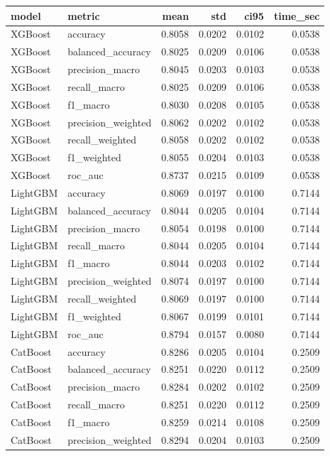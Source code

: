 \begin{tabular}{llrrrr}
\toprule
model & metric & mean & std & ci95 & time_sec \\
\midrule
XGBoost & accuracy & 0.8058 & 0.0202 & 0.0102 & 0.0538 \\
XGBoost & balanced_accuracy & 0.8025 & 0.0209 & 0.0106 & 0.0538 \\
XGBoost & precision_macro & 0.8045 & 0.0203 & 0.0103 & 0.0538 \\
XGBoost & recall_macro & 0.8025 & 0.0209 & 0.0106 & 0.0538 \\
XGBoost & f1_macro & 0.8030 & 0.0208 & 0.0105 & 0.0538 \\
XGBoost & precision_weighted & 0.8062 & 0.0202 & 0.0102 & 0.0538 \\
XGBoost & recall_weighted & 0.8058 & 0.0202 & 0.0102 & 0.0538 \\
XGBoost & f1_weighted & 0.8055 & 0.0204 & 0.0103 & 0.0538 \\
XGBoost & roc_auc & 0.8737 & 0.0215 & 0.0109 & 0.0538 \\
LightGBM & accuracy & 0.8069 & 0.0197 & 0.0100 & 0.7144 \\
LightGBM & balanced_accuracy & 0.8044 & 0.0205 & 0.0104 & 0.7144 \\
LightGBM & precision_macro & 0.8054 & 0.0198 & 0.0100 & 0.7144 \\
LightGBM & recall_macro & 0.8044 & 0.0205 & 0.0104 & 0.7144 \\
LightGBM & f1_macro & 0.8044 & 0.0203 & 0.0102 & 0.7144 \\
LightGBM & precision_weighted & 0.8074 & 0.0197 & 0.0100 & 0.7144 \\
LightGBM & recall_weighted & 0.8069 & 0.0197 & 0.0100 & 0.7144 \\
LightGBM & f1_weighted & 0.8067 & 0.0199 & 0.0101 & 0.7144 \\
LightGBM & roc_auc & 0.8794 & 0.0157 & 0.0080 & 0.7144 \\
CatBoost & accuracy & 0.8286 & 0.0205 & 0.0104 & 0.2509 \\
CatBoost & balanced_accuracy & 0.8251 & 0.0220 & 0.0112 & 0.2509 \\
CatBoost & precision_macro & 0.8284 & 0.0202 & 0.0102 & 0.2509 \\
CatBoost & recall_macro & 0.8251 & 0.0220 & 0.0112 & 0.2509 \\
CatBoost & f1_macro & 0.8259 & 0.0214 & 0.0108 & 0.2509 \\
CatBoost & precision_weighted & 0.8294 & 0.0204 & 0.0103 & 0.2509 \\

\end{tabular}
